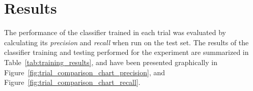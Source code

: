 \documentclass{llncs}
\newcommand{\newterm}[1]{{\textit{#1}}}
\begin{document}
	\section{Results} {
	\label{sec:results}





		The performance of the classifier trained in each trial was evaluated by calculating its \newterm{precision} and \newterm{recall} when run on the test set.
		The results of the classifier training and testing performed for the experiment are summarized in Table~\ref{tab:training_results}, and have been presented graphically in Figure~\ref{fig:trial_comparison_chart_precision}, and Figure~\ref{fig:trial_comparison_chart_recall}.




		



}
\end{document}
